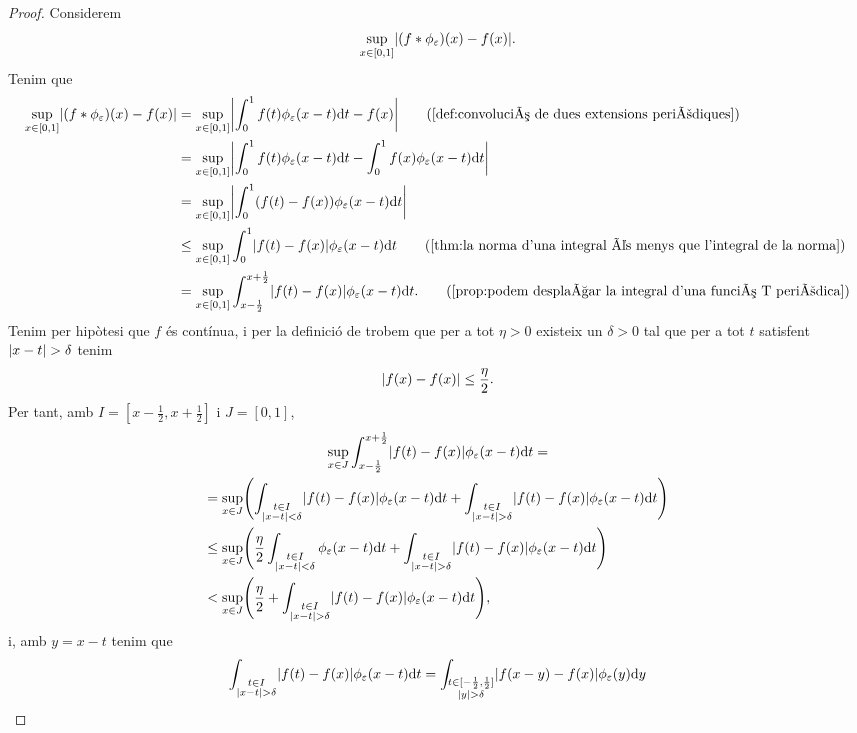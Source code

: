 \documentclass[../Apunts.tex]{subfiles}
\begin{document}
\begin{theorem}
\begin{proof}
			Considerem
			\[\sup_{x\in[0,1]}\abs{(f\convolucio\phi_{\varepsilon})(x)-f(x)}.\]
			Tenim que
			\begin{align*}
				\sup_{x\in[0,1]}\abs{(f\convolucio\phi_{\varepsilon})(x)-f(x)}&=\sup_{x\in[0,1]}\abs{\int_{0}^{1}f(t)\phi_{\varepsilon}(x-t)\diff t-f(x)} \tag{\ref{def:convolució de dues extensions periòdiques}} \\
				&=\sup_{x\in[0,1]}\abs{\int_{0}^{1}f(t)\phi_{\varepsilon}(x-t)\diff t-\int_{0}^{1}f(x)\phi_{\varepsilon}(x-t)\diff t} \\
				&=\sup_{x\in[0,1]}\abs{\int_{0}^{1}(f(t)-f(x))\phi_{\varepsilon}(x-t)\diff t} \\
				&\leq\sup_{x\in[0,1]}\int_{0}^{1}\abs{f(t)-f(x)}\phi_{\varepsilon}(x-t)\diff t \tag{\ref{thm:la norma d'una integral és menys que l'integral de la norma}} \\
				&=\sup_{x\in[0,1]}\int_{x-\frac{1}{2}}^{x+\frac{1}{2}}\abs{f(t)-f(x)}\phi_{\varepsilon}(x-t)\diff t. \tag{\ref{prop:podem desplaçar la integral d'una funció T periòdica}}
			\end{align*}
			 Tenim per hipòtesi que \(f\) és contínua, i per la definició de  trobem que per a tot \(\eta>0\) existeix un \(\delta>0\) tal que per a tot \(t\) satisfent \(\abs{x-t}>\delta\) tenim
			 \[\abs{f(x)-f(x)}\leq\frac{\eta}{2}.\]
			 Per tant, amb \(I=[x-\frac{1}{2},x+\frac{1}{2}]\) i \(J=[0,1]\), %
			 \begin{multline*}
				 \sup_{x\in J}\int_{x-\frac{1}{2}}^{x+\frac{1}{2}}\abs{f(t)-f(x)}\phi_{\varepsilon}(x-t)\diff t = \\
				 =\sup_{x\in J}\left(\int_{\substack{t\in I\\\abs{x-t}<\delta}}\abs{f(t)-f(x)}\phi_{\varepsilon}(x-t)\diff t+\int_{\substack{t\in I\\\abs{x-t}>\delta}}\abs{f(t)-f(x)}\phi_{\varepsilon}(x-t)\diff t\right) \hfill\\
				 \leq\sup_{x\in J}\left(\frac{\eta}{2}\int_{\substack{t\in I\\\abs{x-t}<\delta}}\phi_{\varepsilon}(x-t)\diff t+\int_{\substack{t\in I\\\abs{x-t}>\delta}}\abs{f(t)-f(x)}\phi_{\varepsilon}(x-t)\diff t\right) \hfill\\
				 <\sup_{x\in J}\left(\frac{\eta}{2}+\int_{\substack{t\in I\\\abs{x-t}>\delta}}\abs{f(t)-f(x)}\phi_{\varepsilon}(x-t)\diff t\right), \hfill
			 \end{multline*}
			 i, amb \(y=x-t\) tenim que %
			 \[\int_{\substack{t\in I\\\abs{x-t}>\delta}}\abs{f(t)-f(x)}\phi_{\varepsilon}(x-t)\diff t=\int_{\substack{t\in[-\frac{1}{2},\frac{1}{2}]\\\abs{y}>\delta}}\abs{f(x-y)-f(x)}\phi_{\varepsilon}(y)\diff y\]
		\end{proof}
	\end{theorem}
\end{document}
